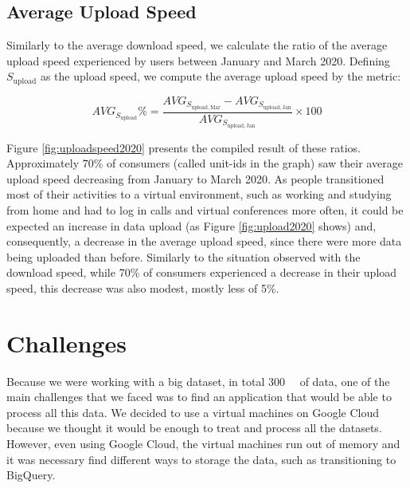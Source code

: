\documentclass[conference,10pt]{IEEEtran}
\begin{document}
\subsection{Average Upload Speed}
\label{sec:average-upload-speed}
Similarly to the average download speed, we calculate the ratio of the average upload speed experienced by users between January and March 2020. Defining $S_{\text{upload}}$ as the upload speed, we compute the average upload speed by the metric:

\begin{equation}
AVG_{S_{\text{upload}}}\% = \frac{AVG_{S_{\text{upload},\, \text{Mar}}}-AVG_{S_{\text{upload},\, \text{Jan}}}}{AVG_{S_{\text{upload},\, \text{Jan}}}}\times 100
\end{equation}


Figure \ref{fig:uploadspeed2020} presents the compiled result of these ratios. Approximately 70\% of consumers (called unit-ids in the graph) saw their average upload speed decreasing from January to March 2020. As people transitioned most of their activities to a virtual environment, such as working and studying from home and had to log in calls and virtual conferences more often, it could be expected an increase in data upload (as Figure \ref{fig:upload2020} shows) and, consequently, a decrease in the average upload speed, since there were more data being uploaded than before. Similarly to the situation observed with the download speed, while 70\% of consumers experienced a decrease in their upload speed, this decrease was also modest, mostly less of 5\%.




\section{Challenges}
\label{sec:challenges}
Because we were working with a big dataset, in total \SI{300}{\giga\byte} of data, one of the main challenges that we faced was to find an application that would be able to process all this data. We decided to use a virtual machines on Google Cloud because we thought it would be enough to treat and process all the datasets. However, even using Google Cloud, the virtual machines run out of memory and it was necessary find different ways to storage the data, such as transitioning to BigQuery.
\end{document}
